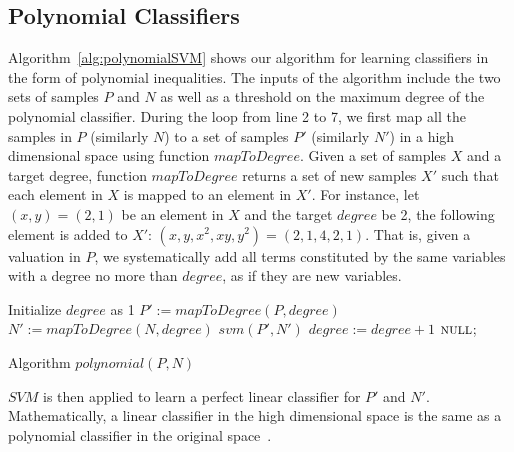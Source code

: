 \subsection{Polynomial Classifiers} Algorithm~\ref{alg:polynomialSVM} shows our algorithm for learning classifiers in the form of polynomial inequalities.
The inputs of the algorithm include the two sets of samples $P$ and $N$ as well as a threshold on the maximum degree of the polynomial classifier.
During the loop from line 2 to 7, we first map all the samples in $P$ (similarly $N$) to a set of samples $P'$ (similarly $N'$) in a high dimensional space using function $\mathit{mapToDegree}$.
Given a set of samples $X$ and a target degree, function $\mathit{mapToDegree}$ returns a set of new samples $X'$ such that each element in $X$ is mapped to an element in $X'$.
For instance, let ${(x, y) =  (2, 1)}$ be an element in $X$ and the target $\mathit{degree}$ be 2, 
the following element is added to $X'$: ${(x, y, x^2, xy, y^2) =  (2, 1, 4, 2, 1)}$.
That is, given a valuation in $P$, we systematically add all terms constituted by the same variables with a degree no more than $\mathit{degree}$, 
as if they are new variables.
\begin{algorithm}[t]
\SetAlgoVlined
\Indm
\Indp
    Initialize $degree$ as 1\;
     {
        $P' := \mathit{mapToDegree}(P, \mathit{degree})$\;
        $N' := \mathit{mapToDegree}(N, \mathit{degree})$\;
         {
            \Return $\mathit{svm}(P', N')$\;
        }
        $\mathit{degree} := \mathit{degree} + 1$\;
    }
    \Return $\textsc{null}$;
\caption{Algorithm $\mathit{polynomial}(P,N)$}
\label{alg:polynomialSVM}
\end{algorithm}
$\mathit{SVM}$ is then applied to learn a perfect linear classifier for $P'$ and $N'$. %
Mathematically, a linear classifier in the high dimensional space is the same as a polynomial classifier in the original space~\cite{svm:kernel}.
